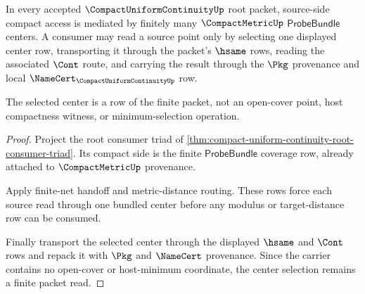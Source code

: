 \begin{theorem}
\label{thm:compact-uniform-continuity-root-probebundle-center-selection}
In every accepted $\CompactUniformContinuityUp$ root packet, source-side compact access is mediated by finitely many $\CompactMetricUp$ $\mathsf{ProbeBundle}$ centers. A consumer may read a source point only by selecting one displayed center row, transporting it through the packet's $\hsame$ rows, reading the associated $\Cont$ route, and carrying the result through the $\Pkg$ provenance and local $\NameCert_{\CompactUniformContinuityUp}$ row.

The selected center is a row of the finite packet, not an open-cover point, host compactness witness, or minimum-selection operation.
\end{theorem}
\begin{proof}
Project the root consumer triad of \autoref{thm:compact-uniform-continuity-root-consumer-triad}. Its compact side is the finite $\mathsf{ProbeBundle}$ coverage row, already attached to $\CompactMetricUp$ provenance.

Apply finite-net handoff and metric-distance routing. These rows force each source read through one bundled center before any modulus or target-distance row can be consumed.

Finally transport the selected center through the displayed $\hsame$ and $\Cont$ rows and repack it with $\Pkg$ and $\NameCert$ provenance. Since the carrier contains no open-cover or host-minimum coordinate, the center selection remains a finite packet read.
\end{proof}

